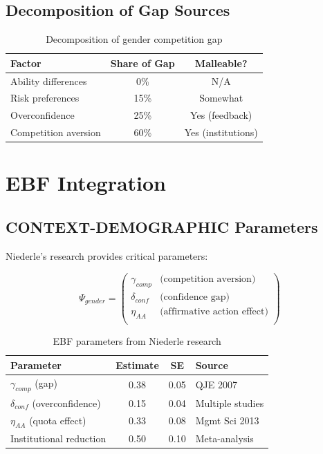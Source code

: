 \subsection{Decomposition of Gap Sources}

\begin{table}[h]
\centering
\begin{tabular}{lcc}
\hline
\textbf{Factor} & \textbf{Share of Gap} & \textbf{Malleable?} \\
\hline
Ability differences & 0\% & N/A \\
Risk preferences & 15\% & Somewhat \\
Overconfidence & 25\% & Yes (feedback) \\
Competition aversion & 60\% & Yes (institutions) \\
\hline
\end{tabular}
\caption{Decomposition of gender competition gap}
\end{table}

\section{EBF Integration}

\subsection{CONTEXT-DEMOGRAPHIC Parameters}

Niederle's research provides critical parameters:

\begin{equation}
\Psi_{gender} = \begin{pmatrix}
\gamma_{comp} & \text{(competition aversion)} \\
\delta_{conf} & \text{(confidence gap)} \\
\eta_{AA} & \text{(affirmative action effect)} \\
\end{pmatrix}
\end{equation}

\begin{table}[h]
\centering
\begin{tabular}{lccl}
\hline
\textbf{Parameter} & \textbf{Estimate} & \textbf{SE} & \textbf{Source} \\
\hline
$\gamma_{comp}$ (gap) & 0.38 & 0.05 & QJE 2007 \\
$\delta_{conf}$ (overconfidence) & 0.15 & 0.04 & Multiple studies \\
$\eta_{AA}$ (quota effect) & 0.33 & 0.08 & Mgmt Sci 2013 \\
Institutional reduction & 0.50 & 0.10 & Meta-analysis \\
\hline
\end{tabular}
\caption{EBF parameters from Niederle research}
\end{table}

